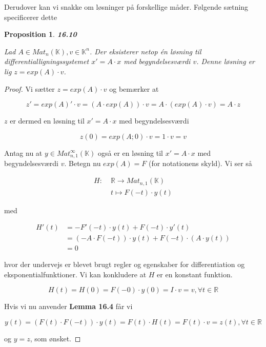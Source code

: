 \documentclass[paper=a4, fontsize=11pt]{scrartcl} %
\newtheorem*{proposition}{Proposition}
\newenvironment{cstmproposition}[1]{\begin{proposition} {\normalfont\textbf{#1}}}{\end{proposition}}
\begin{document}
			
			Derudover kan vi snakke om løsninger på forskellige måder. Følgende sætning specificerer dette
			
			\begin{cstmproposition}{16.10}
				
				Lad $A \in Mat_n(\mathbb{K}), v \in \mathbb{K}^n$. Der eksisterer netop én løsning til differentialligningssystemet $x' = A \cdot x$ med begyndelsesværdi $v$. Denne løsning er lig $z = exp(A) \cdot v$.
				
			\end{cstmproposition}
			
			\begin{proof}
				
				Vi sætter $z = exp(A) \cdot v$ og bemærker at
				
				\[z' = exp(A)' \cdot v = (A \cdot exp(A)) \cdot v = A \cdot (exp(A) \cdot v) = A \cdot z\]
				
				$z$ er dermed en løsning til $x' = A \cdot x$ med begyndelsesværdi
				
				\[z(0) = exp(A;0) \cdot v = 1 \cdot v = v\]
				
				Antag nu at $y \in Mat_{n,1}^{\infty}(\mathbb{K})$ også er en løsning til $x' = A \cdot x$ med begyndelsesværdi $v$. Betegn nu $exp(A) = F$ (for notationens skyld). Vi ser så
				
				\begin{align*}
				H: \; &\mathbb{R} \rightarrow Mat_{n,1}(\mathbb{K})\\
				&t \mapsto F(-t) \cdot y(t)
				\end{align*}
				
				med 
				
				\begin{align*}
				H'(t) &= -F'(-t) \cdot y(t) + F(-t) \cdot y'(t) \\
				&= (-A\cdot F(-t)) \cdot y(t) + F(-t) \cdot (A \cdot y(t))\\
				&= 0
				\end{align*}
				
				hvor der undervejs er blevet brugt regler og egenskaber for differentiation og eksponentialfunktioner. Vi kan konkludere at $H$ er en konstant funktion.
				
				\[H(t) = H(0) = F(-0) \cdot y(0) = I \cdot v = v, \forall t \in \mathbb{R}\]
				
				Hvis vi nu anvender \textbf{Lemma 16.4} får vi
				
				\[y(t) = (F(t) \cdot F(-t)) \cdot y(t) = F(t) \cdot H(t) = F(t) \cdot v = z(t), \forall t \in \mathbb{R}\]
				
				og $y = z$, som ønsket.
				
				
			\end{proof}
			
\end{document}
